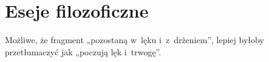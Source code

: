\documentclass[a4paper,11pt]{article}
\begin{document}
\vspace{\spaceTwo}








\section{Eseje filozoficzne}







\start {} Możliwe, że fragment „pozostaną w~lęku
i~z~drżeniem”, lepiej byłoby przetłumaczyć jak „poczują lęk
i~trwogę”.

\vspace{\spaceFour}





\end{document}
